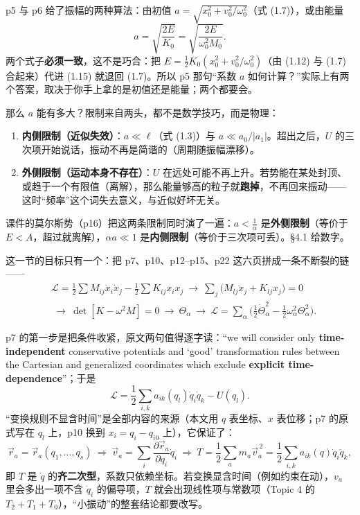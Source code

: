 \documentclass[11pt]{ctexart}
\begin{document}

p5 与 p6 给了振幅的两种算法：由初值 $a=\sqrt{x_0^2+v_0^2/\omega_0^2}$（式 (1.7)），或由能量
\[
a=\sqrt{\frac{2E}{K_0}}=\sqrt{\frac{2E}{\omega_0^2M_0}} .
\tag{1.15}
\]
两个式子\textbf{必须一致}，这不是巧合：把 $E=\frac12K_0(x_0^2+v_0^2/\omega_0^2)$（由 (1.12) 与 (1.7) 合起来）代进 (1.15) 就退回 (1.7)。所以 p5 那句“系数 $a$ 如何计算？”实际上有两个答案，取决于你手上拿的是初值还是能量；两个都要会。

那么 $a$ 能有多大？限制来自两头，都不是数学技巧，而是物理：

\begin{enumerate}
\item \textbf{内侧限制（近似失效）}：$a\ll\ell$（式 (1.3)）与 $a\ll a_0/|a_1|$。超出之后，$U$ 的三次项开始说话，振动不再是简谐的（周期随振幅漂移）。
\item \textbf{外侧限制（运动本身不存在）}：$U$ 在远处可能不再上升。若势能在某处封顶、或趋于一个有限值（离解），那么能量够高的粒子就\textbf{跑掉}，不再回来振动——这时“频率”这个词失去意义，与近似好坏无关。
\end{enumerate}

课件的莫尔斯势（p16）把这两条限制同时演了一遍：$a<\frac{1}{\alpha}$ 是\textbf{外侧限制}（等价于 $E<A$，超过就离解），$\alpha a\ll1$ 是\textbf{内侧限制}（等价于三次项可丢）。§4.1 给数字。

\flowerrule


这一节的目标只有一个：把 p7、p10、p12--p15、p22 这六页拼成一条不断裂的链——
\[
\begin{aligned}
&\mathcal{L}=\tfrac12\sum M_{ij}\dot x_i\dot x_j-\tfrac12\sum K_{ij}x_ix_j
\ \longrightarrow\ \sum_j\bigl(M_{lj}\ddot x_j+K_{lj}x_j\bigr)=0\\[2pt]
&\ \longrightarrow\ \det[K-\omega^2M]=0
\ \longrightarrow\ \Theta_\alpha
\ \longrightarrow\ \mathcal{L}=\sum_\alpha\bigl(\tfrac12\dot\Theta_\alpha^2-\tfrac12\omega_\alpha^2\Theta_\alpha^2\bigr).
\end{aligned}
\]


p7 的第一步是把条件收紧，原文两句值得逐字读：“we will consider only \textbf{time-independent} conservative potentials and ‘good’ transformation rules between the Cartesian and generalized coordinates which exclude \textbf{explicit time-dependence}”；于是
\[
\mathcal{L}=\frac12\sum_{i,k}a_{ik}(q_l)\dot q_i\dot q_k-U(q_l).
\tag{2.1}
\]
“变换规则不显含时间”是全部内容的来源（本文用 $q$ 表坐标、$x$ 表位移；p7 的原式写在 $q_l$ 上，p10 换到 $x_i=q_i-q_{i0}$ 上），它保证了：
\[
\vec r_a=\vec r_a(q_1,\dots,q_s)\ \Longrightarrow\ \vec v_a=\sum_i\frac{\partial\vec r_a}{\partial q_i}\dot q_i
\ \Longrightarrow\ T=\frac12\sum_am_a\vec v_a^{\,2}=\frac12\sum_{i,k}a_{ik}(q)\dot q_i\dot q_k ,
\]
即 $T$ 是 $\dot q$ 的\textbf{齐二次型}，系数只依赖坐标。若变换显含时间（例如约束在动），$v_a$ 里会多出一项不含 $\dot q_i$ 的偏导项，$T$ 就会出现线性项与常数项（Topic 4 的 $T_2+T_1+T_0$），“小振动”的整套结论都要改写。
\end{document}
